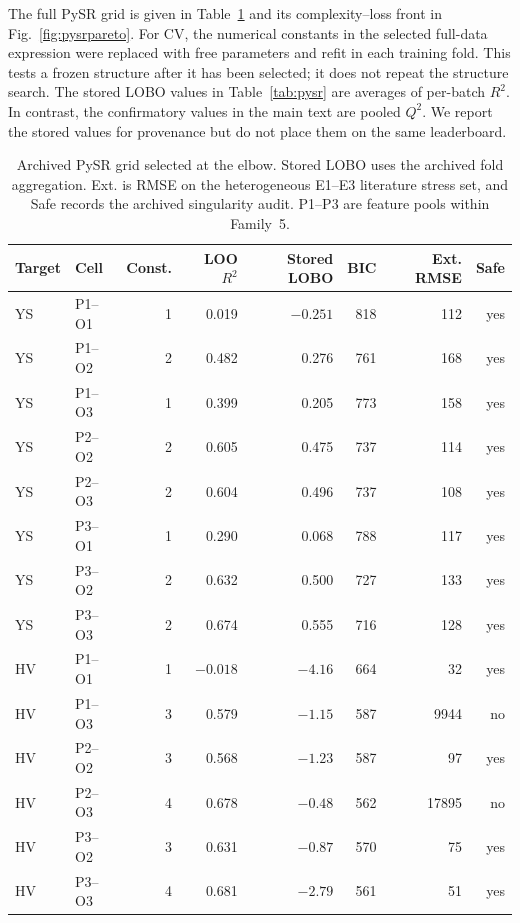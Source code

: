 \documentclass[a4paper,11pt]{article}
\begin{document}
The full PySR grid is given in Table~\ref{tab:pysrgrid} and its complexity--loss front in Fig.~\ref{fig:pysrpareto}. For CV, the numerical constants in the selected full-data expression were replaced with free parameters and refit in each training fold. This tests a frozen structure after it has been selected; it does not repeat the structure search. The stored LOBO values in Table~\ref{tab:pysr} are averages of per-batch $R^2$. In contrast, the confirmatory values in the main text are pooled $Q^2$. We report the stored values for provenance but do not place them on the same leaderboard.

\begin{table}[H]
\centering
\caption{Archived PySR grid selected at the elbow. Stored LOBO uses the archived fold aggregation. Ext. is RMSE on the heterogeneous E1--E3 literature stress set, and Safe records the archived singularity audit. P1--P3 are feature pools within Family~5.}
\label{tab:pysrgrid}
\footnotesize
\setlength{\tabcolsep}{3.5pt}
\begin{tabular}{llrrrrrr}
\toprule
Target & Cell & Const. & LOO $R^2$ & Stored LOBO & BIC & Ext. RMSE & Safe \\
\midrule
YS & P1--O1 & 1 & 0.019 & $-0.251$ & 818 & 112 & yes \\
YS & P1--O2 & 2 & 0.482 & 0.276 & 761 & 168 & yes \\
YS & P1--O3 & 1 & 0.399 & 0.205 & 773 & 158 & yes \\
YS & P2--O2 & 2 & 0.605 & 0.475 & 737 & 114 & yes \\
YS & P2--O3 & 2 & 0.604 & 0.496 & 737 & 108 & yes \\
YS & P3--O1 & 1 & 0.290 & 0.068 & 788 & 117 & yes \\
YS & P3--O2 & 2 & 0.632 & 0.500 & 727 & 133 & yes \\
YS & P3--O3 & 2 & 0.674 & 0.555 & 716 & 128 & yes \\
\midrule
HV & P1--O1 & 1 & $-0.018$ & $-4.16$ & 664 & 32 & yes \\
HV & P1--O3 & 3 & 0.579 & $-1.15$ & 587 & 9944 & no \\
HV & P2--O2 & 3 & 0.568 & $-1.23$ & 587 & 97 & yes \\
HV & P2--O3 & 4 & 0.678 & $-0.48$ & 562 & 17895 & no \\
HV & P3--O2 & 3 & 0.631 & $-0.87$ & 570 & 75 & yes \\
HV & P3--O3 & 4 & 0.681 & $-2.79$ & 561 & 51 & yes \\
\bottomrule
\end{tabular}
\end{table}
\end{document}
